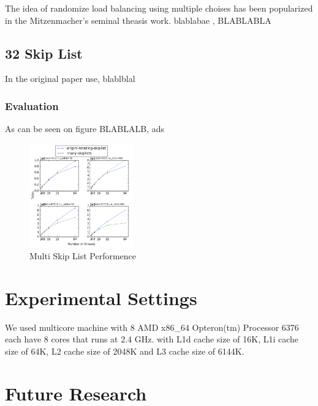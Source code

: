 \documentclass{article}
\begin{document}
The idea of randomize load balancing using multiple choises has been popularized in the Mitzenmacher's seminal theasis work\cite{C5}. blablabae , BLABLABLA

\subsection{32 Skip List}
\label{ssec:dsrs}

In the original paper use, blablblal

\subsubsection{Evaluation}
\label{sssec:dsrs-evl}

As can be seen on figure BLABLALB, ads

\begin{figure}
	\caption{Multi Skip List Performence}
	\centering
	\includegraphics[width=0.4\textwidth]{many-skiplists_plot}
\end{figure}

\section{Experimental Settings}
\label{sec:exp}

We used multicore machine with 8 AMD x86\_64 Opteron(tm) Processor 6376 each have 8 cores that runs at 2.4 GHz. with L1d cache size of 16K, L1i cache size of 64K, L2 cache size of 2048K and L3 cache size of 6144K.

\section{Future Research}
\label{sec:foot}
\end{document}
